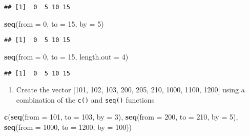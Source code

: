\documentclass[]{book}
\newenvironment{Shaded}{\begin{snugshade}}{\end{snugshade}}
\newcommand{\KeywordTok}[1]{\textcolor[rgb]{0.13,0.29,0.53}{\textbf{{#1}}}}
\newcommand{\DataTypeTok}[1]{\textcolor[rgb]{0.13,0.29,0.53}{{#1}}}
\newcommand{\DecValTok}[1]{\textcolor[rgb]{0.00,0.00,0.81}{{#1}}}
\newcommand{\NormalTok}[1]{{#1}}
\providecommand{\tightlist}{%
  \setlength{\itemsep}{0pt}\setlength{\parskip}{0pt}}
\begin{document}
\begin{verbatim}
## [1]  0  5 10 15
\end{verbatim}

\begin{Shaded}
\begin{Highlighting}[]
\KeywordTok{seq}\NormalTok{(}\DataTypeTok{from =} \DecValTok{0}\NormalTok{, }\DataTypeTok{to =} \DecValTok{15}\NormalTok{, }\DataTypeTok{by =} \DecValTok{5}\NormalTok{)}
\end{Highlighting}
\end{Shaded}

\begin{verbatim}
## [1]  0  5 10 15
\end{verbatim}

\begin{Shaded}
\begin{Highlighting}[]
\KeywordTok{seq}\NormalTok{(}\DataTypeTok{from =} \DecValTok{0}\NormalTok{, }\DataTypeTok{to =} \DecValTok{15}\NormalTok{, }\DataTypeTok{length.out =} \DecValTok{4}\NormalTok{)}
\end{Highlighting}
\end{Shaded}

\begin{verbatim}
## [1]  0  5 10 15
\end{verbatim}

\begin{enumerate}
\def\labelenumi{\arabic{enumi}.}
\setcounter{enumi}{3}
\tightlist
\item
  Create the vector {[}101, 102, 103, 200, 205, 210, 1000, 1100, 1200{]}
  using a combination of the \texttt{c()} and \texttt{seq()} functions
\end{enumerate}

\begin{Shaded}
\begin{Highlighting}[]
\KeywordTok{c}\NormalTok{(}\KeywordTok{seq}\NormalTok{(}\DataTypeTok{from =} \DecValTok{101}\NormalTok{, }\DataTypeTok{to =} \DecValTok{103}\NormalTok{, }\DataTypeTok{by =} \DecValTok{3}\NormalTok{), }
  \KeywordTok{seq}\NormalTok{(}\DataTypeTok{from =} \DecValTok{200}\NormalTok{, }\DataTypeTok{to =} \DecValTok{210}\NormalTok{, }\DataTypeTok{by =} \DecValTok{5}\NormalTok{), }
  \KeywordTok{seq}\NormalTok{(}\DataTypeTok{from =} \DecValTok{1000}\NormalTok{, }\DataTypeTok{to =} \DecValTok{1200}\NormalTok{, }\DataTypeTok{by =} \DecValTok{100}\NormalTok{))}
\end{Highlighting}
\end{Shaded}
\end{document}
